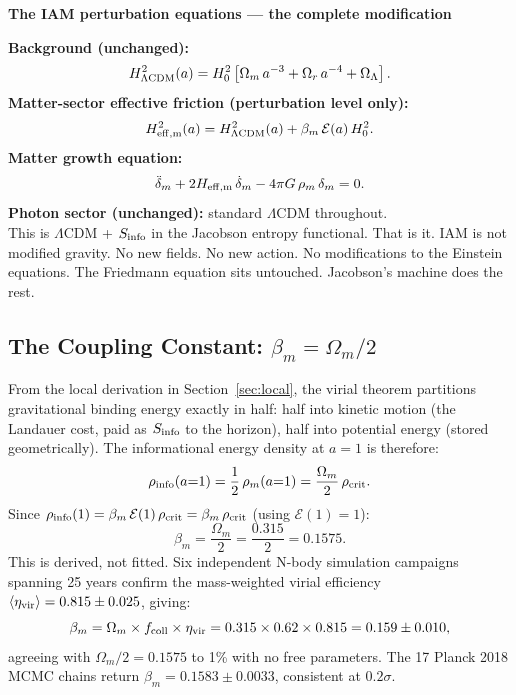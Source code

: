 \documentclass[12pt,a4paper]{article}
\begin{document}
\begin{keybox}
\begin{center}
\textbf{The IAM perturbation equations --- the complete modification}
\end{center}
\textbf{Background (unchanged):}
\begin{equation}
H^2_{\Lambda{\rm CDM}}(a) = H_0^2\left[\Omega_m\,a^{-3}
+ \Omega_r\,a^{-4} + \Omega_\Lambda\right].
\label{eq:friedmann_background}
\end{equation}
\textbf{Matter-sector effective friction (perturbation level only):}
\begin{equation}
H_{\rm eff,m}^2(a) = H_{\Lambda{\rm CDM}}^2(a) + \beta_m\,\mathcal{E}(a)\,H_0^2.
\label{eq:heff}
\end{equation}
\textbf{Matter growth equation:}
\begin{equation}
\ddot{\delta}_m + 2H_{\rm eff,m}\,\dot{\delta}_m - 4\pi G\,\rho_m\,\delta_m = 0.
\label{eq:growth}
\end{equation}
\textbf{Photon sector (unchanged):} standard $\Lambda$CDM throughout.\\[0.3em]
This is $\Lambda$CDM + $S_{\rm info}$ in the Jacobson entropy functional.
That is it. IAM is not modified gravity. No new fields. No new action.
No modifications to the Einstein equations. The Friedmann equation sits
untouched. Jacobson's machine does the rest.
\end{keybox}

\subsection{The Coupling Constant: $\beta_m = \Omega_m/2$}

From the local derivation in Section~\ref{sec:local}, the virial theorem
partitions gravitational binding energy exactly in half: half into kinetic
motion (the Landauer cost, paid as $S_{\rm info}$ to the horizon), half into
potential energy (stored geometrically). The informational energy density
at $a = 1$ is therefore:
\begin{equation}
\rho_{\rm info}(a{=}1) = \frac{1}{2}\,\rho_m(a{=}1)
= \frac{\Omega_m}{2}\,\rho_{\rm crit}.
\end{equation}
Since $\rho_{\rm info}(1) = \beta_m\,\mathcal{E}(1)\,\rho_{\rm crit}
= \beta_m\,\rho_{\rm crit}$ (using $\mathcal{E}(1)=1$):
\begin{equation}
\boxed{\beta_m = \frac{\Omega_m}{2} = \frac{0.315}{2} = 0.1575.}
\label{eq:beta}
\end{equation}
This is derived, not fitted. Six independent N-body simulation campaigns
spanning 25 years confirm the mass-weighted virial efficiency
$\langle\eta_{\rm vir}\rangle = 0.815 \pm 0.025$, giving:
\begin{equation}
\beta_m = \Omega_m \times f_{\rm coll} \times \eta_{\rm vir}
= 0.315 \times 0.62 \times 0.815 = 0.159 \pm 0.010,
\end{equation}
agreeing with $\Omega_m/2 = 0.1575$ to 1\% with no free parameters.
The 17 Planck 2018 MCMC chains return $\beta_m = 0.1583 \pm 0.0033$, consistent
at $0.2\sigma$.
\end{document}
